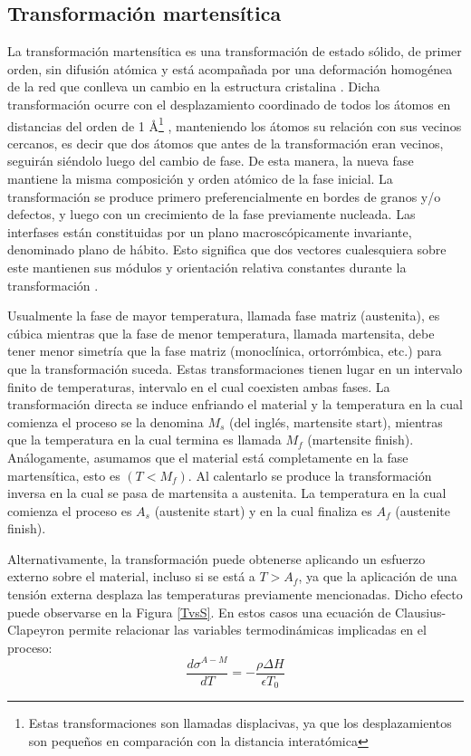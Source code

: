 \documentclass[12pt]{article}
\theoremstyle{definition}
\theoremstyle{remark}
\begin{document}
\subsection{Transformación martensítica}

La transformación martensítica es una transformación de estado sólido, de primer orden, sin difusión atómica y está acompañada por una deformación homogénea de la red que conlleva un cambio en la estructura cristalina \cite{Santamarta}. Dicha transformación ocurre con el desplazamiento coordinado de todos los átomos en distancias del orden de 1 \AA \footnote{Estas transformaciones son llamadas displacivas, ya que los desplazamientos son pequeños en comparación con la distancia interatómica} , manteniendo los átomos su relación con sus vecinos cercanos, es decir que dos átomos que antes de la transformación eran vecinos, seguirán siéndolo luego del cambio de fase\cite{HTSMA}. De esta manera, la nueva fase mantiene la misma composición y orden atómico de la fase inicial. La transformación se produce primero preferencialmente en bordes de granos y/o defectos, y luego con un crecimiento de la fase previamente nucleada. Las interfases están constituidas por un plano macroscópicamente invariante, denominado plano de hábito. Esto significa que dos vectores cualesquiera sobre este mantienen sus módulos y orientación relativa constantes durante la transformación \cite{Santamarta}.

Usualmente la fase de mayor temperatura, llamada fase matriz (austenita), es cúbica mientras que la fase de menor temperatura, llamada martensita, debe tener menor simetría que la fase matriz (monoclínica, ortorrómbica, etc.) para que la transformación suceda\cite{Malvasio}. Estas transformaciones tienen lugar en un intervalo finito de temperaturas, intervalo en el cual coexisten ambas fases. La transformación directa se induce enfriando el material y la temperatura en la cual comienza el proceso se la denomina $M_s$ (del inglés, martensite start), mientras que la temperatura en la cual termina es llamada $M_f$ (martensite finish). Análogamente, asumamos que el material está completamente en la fase martensítica, esto es $(T < M_f)$. Al calentarlo se produce la transformación inversa en la cual se pasa de martensita a austenita. La temperatura en la cual comienza el proceso es $A_s$ (austenite start) y en la cual finaliza es $A_f$ (austenite finish)\cite{Santamarta}.

Alternativamente, la transformación puede obtenerse aplicando un esfuerzo externo sobre el material, incluso si se está a $T > A_f$, ya que la aplicación de una tensión externa desplaza las temperaturas previamente mencionadas. Dicho efecto puede observarse en la Figura \ref{TvsS}. En estos casos una ecuación de Clausius-Clapeyron permite relacionar las variables termodinámicas implicadas en el proceso:
\begin{equation}
	\frac{d\sigma^{A-M}}{dT} = -\frac{\rho \Delta H}{\epsilon T_0}
\end{equation}
\end{document}
